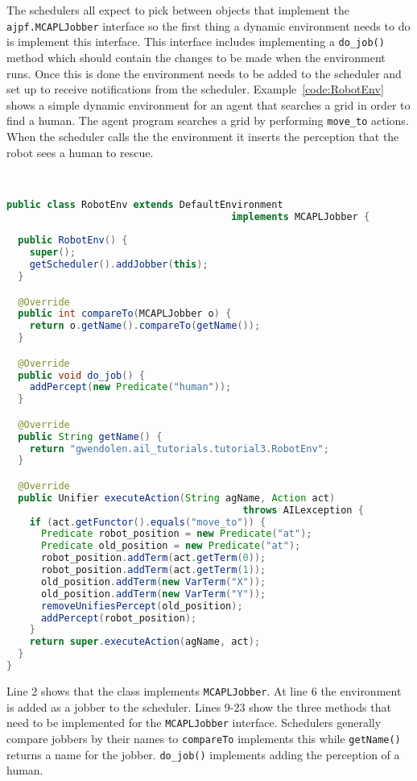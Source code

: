 \begin{sloppypar}
The schedulers all expect to pick between objects that implement the \texttt{ajpf.MCAPLJobber} interface so the first thing a dynamic environment needs to do is implement this interface.  This interface includes implementing a \texttt{do\_job()} method which should contain the changes to be made when the environment runs.  Once this is done the environment needs to be added to the scheduler and set up to receive notifications from the scheduler.  Example~\ref{code:RobotEnv} shows a simple dynamic environment for an agent that searches a grid in order to find a human.  The agent program searches a grid by performing \lstinline{move_to} actions.  When the scheduler calls the the environment it inserts the perception that the robot sees a human to rescue.  
\end{sloppypar}
\begin{ourexample}
\label{code:RobotEnv} \quad \\
\begin{lstlisting}[basicstyle=\sffamily,language=Java,style=easslisting]
public class RobotEnv extends DefaultEnvironment
                                       implements MCAPLJobber {
	
  public RobotEnv() {
    super();
    getScheduler().addJobber(this);
  }

  @Override
  public int compareTo(MCAPLJobber o) {
    return o.getName().compareTo(getName());
  }

  @Override
  public void do_job() {
    addPercept(new Predicate("human"));
  }

  @Override
  public String getName() {
    return "gwendolen.ail_tutorials.tutorial3.RobotEnv";
  }   

  @Override
  public Unifier executeAction(String agName, Action act) 
                                         throws AILexception {
    if (act.getFunctor().equals("move_to")) {
      Predicate robot_position = new Predicate("at");
      Predicate old_position = new Predicate("at");
      robot_position.addTerm(act.getTerm(0));
      robot_position.addTerm(act.getTerm(1));
      old_position.addTerm(new VarTerm("X"));
      old_position.addTerm(new VarTerm("Y"));
      removeUnifiesPercept(old_position);
      addPercept(robot_position);
    }
    return super.executeAction(agName, act);
  }
}
\end{lstlisting}
\end{ourexample}
Line 2 shows that the class implements \texttt{MCAPLJobber}.  At line 6 the environment is added as a jobber to the scheduler.  Lines 9-23 show the three methods that need to be implemented for the \texttt{MCAPLJobber} interface.  Schedulers generally compare jobbers by their names to \texttt{compareTo} implements this while \texttt{getName()} returns a name for the jobber.  \texttt{do\_job()} implements adding the perception of a human.

